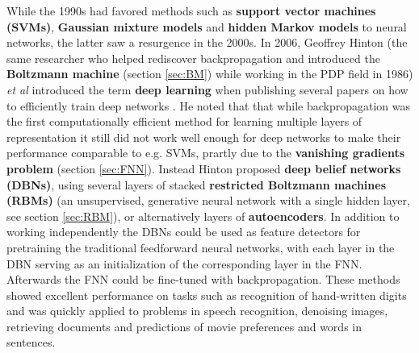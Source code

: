 \documentclass[twoside,english]{uiofysmaster}
\begin{document}

While the 1990s had favored methods such as \textbf{support vector machines (SVMs)}, \textbf{Gaussian mixture models} and \textbf{hidden Markov models} to neural networks, the latter saw a resurgence in the 2000s. In 2006, Geoffrey Hinton (the same researcher who helped rediscover backpropagation and introduced the \textbf{Boltzmann machine} (section \ref{sec:BM}) while working in the PDP field in 1986) \textit{et al} introduced the term \textbf{deep learning} when publishing several papers on how to efficiently train deep networks \cite{Hinton2006a} \cite{Hinton2006} \cite{Hinton2007}. He noted that that while backpropagation was the first computationally efficient method for learning multiple layers of representation it still did not work well enough for deep networks to make their performance comparable to e.g. SVMs, prartly due to the \textbf{vanishing gradients problem} (section \ref{sec:FNN}).
Instead Hinton proposed \textbf{deep belief networks (DBNs)}, using several layers of stacked \textbf{restricted Boltzmann machines (RBMs)} (an unsupervised, generative neural network with a single hidden layer, see section \ref{sec:RBM}), or alternatively layers of \textbf{autoencoders}. In addition to working independently the DBNs could be used as feature detectors for pretraining the traditional feedforward neural networks, with each layer in the DBN serving as an initialization of the corresponding layer in the FNN. Afterwards the FNN could be fine-tuned with backpropagation. These methods showed excellent performance on tasks such as recognition of hand-written digits and was quickly applied to problems in speech recognition, denoising images, retrieving documents and predictions of movie preferences and words in sentences. 
\end{document}
